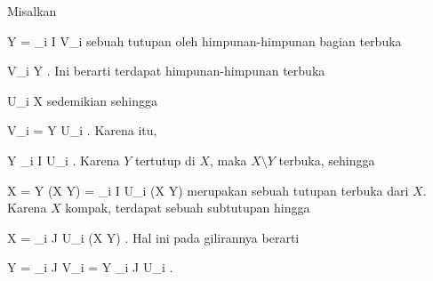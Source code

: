 Misalkan

\mavergleichskettedisp
{\vergleichskette
{ Y
}
{ =} { \bigcup_{i \in I} V_i
}
{ } {
}
{ } {
}
{ } {
}
}
{}{}{}
sebuah tutupan oleh himpunan-himpunan bagian terbuka

\mavergleichskette
{\vergleichskette
{ V_i
}
{ \subseteq }{ Y
}
{  }{
}
{    }{
}
{   }{
}
}
{}{}{.}
Ini berarti terdapat himpunan-himpunan terbuka

\mavergleichskette
{\vergleichskette
{ U_i
}
{ \subseteq }{ X
}
{  }{
}
{    }{
}
{   }{
}
}
{}{}{}
sedemikian sehingga

\mavergleichskette
{\vergleichskette
{ V_i
}
{ = }{ Y \cap U_i
}
{  }{
}
{    }{
}
{   }{
}
}
{}{}{.}
Karena itu,

\mavergleichskettedisp
{\vergleichskette
{ Y
}
{ \subseteq} { \bigcup_{i \in I} U_i
}
{ } {
}
{ } {
}
{ } {
}
}
{}{}{.}
Karena $Y$ tertutup di $X$, maka $X \setminus Y$ terbuka, sehingga

\mavergleichskettedisp
{\vergleichskette
{ X
}
{ =} { Y \cup (X \setminus Y)
}
{ =} { \bigcup_{i \in I} U_i  \cup  (X \setminus Y)
}
{ } {
}
{ } {
}
}
{}{}{}
merupakan sebuah tutupan terbuka dari $X$. Karena $X$ kompak, terdapat sebuah subtutupan hingga

\mavergleichskettedisp
{\vergleichskette
{ X
}
{ =} { \bigcup_{i \in J} U_i  \cup  (X \setminus Y)
}
{ } {
}
{ } {
}
{ } {}
}
{}{}{.}
Hal ini pada gilirannya berarti

\mavergleichskettedisp
{\vergleichskette
{ Y
}
{ =} { \bigcup_{i \in J} V_i
}
{ =} { Y \cap \bigcup_{i \in J} U_i
}
{ } {
}
{ } {}
}
{}{}{.}
